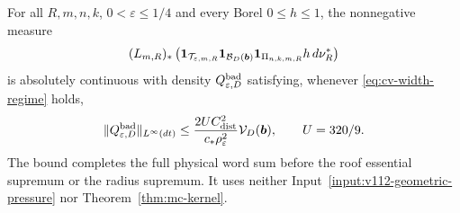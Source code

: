 \begin{theorem}
\label{thm:cv-positive-roof}
For all $R,m,n,k$, $0<\varepsilon\le1/4$ and every Borel
$0\le h\le1$, the nonnegative measure
\[
 (L_{m,R})_*\left(
  \mathbf1_{\mathcal T_{\varepsilon,m,R}}
  \mathbf1_{\mathcal B_D(\boldsymbol b)}
  \mathbf1_{\Pi_{n,k,m,R}}h\,d\nu_R^*\right)
\]
is absolutely continuous with density $Q^{\rm bad}_{\varepsilon,D}$
satisfying, whenever \eqref{eq:cv-width-regime} holds,
\begin{equation}\label{eq:cv-positive-roof}
 \|Q^{\rm bad}_{\varepsilon,D}\|_{L^\infty(dt)}
   \le\frac{2U C_{\rm dist}^2}{c_*\rho_\varepsilon^2}
                                  \mathcal V_D(\boldsymbol b),
 \qquad U=320/9.
\end{equation}
The bound completes the full physical word sum before the
roof essential supremum or the radius supremum.  It uses neither
Input~\ref{input:v112-geometric-pressure} nor
Theorem~\ref{thm:mc-kernel}.
\end{theorem}
